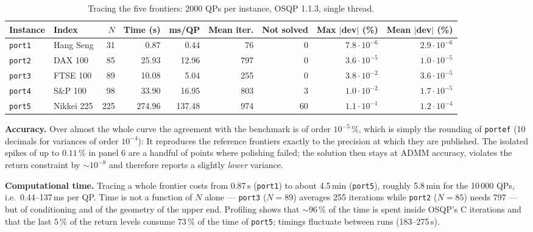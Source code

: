 \documentclass[10pt,a4paper]{article}
\begin{document}
\begin{table}[H]
\centering
\small
\caption{Tracing the five frontiers: 2000 QPs per instance, OSQP 1.1.3, single thread.}
\label{tab:results}
\footnotesize
\begin{tabular}{@{}llrrrrrrr@{}}
\toprule
Instance & Index & $N$ & Time (s) & ms/QP & Mean iter. & Not solved & Max $|$dev$|$ (\%) & Mean $|$dev$|$ (\%) \\
\midrule
\texttt{port1} & Hang Seng  & 31  & 0.87   & 0.44   & 76  & 0  & $7.8\cdot10^{-6}$ & $2.9\cdot10^{-6}$ \\
\texttt{port2} & DAX 100    & 85  & 25.93  & 12.96  & 797 & 0  & $3.6\cdot10^{-5}$ & $1.0\cdot10^{-5}$ \\
\texttt{port3} & FTSE 100   & 89  & 10.08  & 5.04   & 255 & 0  & $3.8\cdot10^{-2}$ & $3.6\cdot10^{-5}$ \\
\texttt{port4} & S\&P 100   & 98  & 33.90  & 16.95  & 803 & 3  & $1.0\cdot10^{-2}$ & $1.7\cdot10^{-5}$ \\
\texttt{port5} & Nikkei 225 & 225 & 274.96 & 137.48 & 974 & 60 & $1.1\cdot10^{-1}$ & $1.2\cdot10^{-4}$ \\
\bottomrule
\end{tabular}
\end{table}


\textbf{Accuracy.} Over almost the whole curve the agreement with the benchmark is of order
$10^{-5}\,\%$, which is simply the rounding of \texttt{portef} (10 decimals for variances of order
$10^{-4}$): It reproduces the reference frontiers exactly to the precision at which they are published.
The isolated spikes of up to $0.11\,\%$ in panel 6 are a handful of points where polishing failed; the
solution then stays at ADMM accuracy, violates the return constraint by $\sim10^{-8}$ and therefore
reports a slightly \emph{lower} variance.

\textbf{Computational time.} Tracing a whole frontier costs from 0.87\,s (\texttt{port1}) to about
4.5\,min (\texttt{port5}), roughly 5.8\,min for the 10\,000 QPs, i.e.\ 0.44--137\,ms per QP. Time is not
a function of $N$ alone --- \texttt{port3} ($N=89$) averages 255 iterations while \texttt{port2}
($N=85$) needs 797 --- but of conditioning and of the geometry of the upper end. Profiling shows that
$\sim96\,\%$ of the time is spent inside OSQP's C iterations and that the last $5\,\%$ of the return
levels consume $73\,\%$ of the time of \texttt{port5}; timings fluctuate between runs (183--275\,s).
\end{document}
